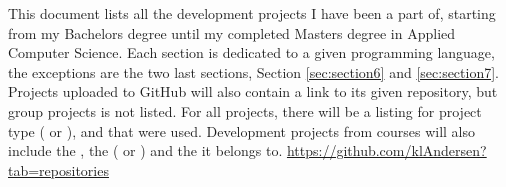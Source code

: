 \label{sec:introduction}


This document lists all the development projects I have been a part of, starting from my Bachelors degree until my completed Masters degree in Applied Computer Science. 
Each section is dedicated to a given programming language, the exceptions are the two last sections, Section \ref{sec:section6} and \ref{sec:section7}.
Projects uploaded to GitHub will also contain a link to its given repository, but group projects is not listed.
For all projects, there will be a listing for project type ( or ),  and  that were used. 
Development projects from courses will also include the , the  ( or ) and the  it belongs to.
\vspace{0.5em}\newline
{} \url{https://github.com/klAndersen?tab=repositories}
